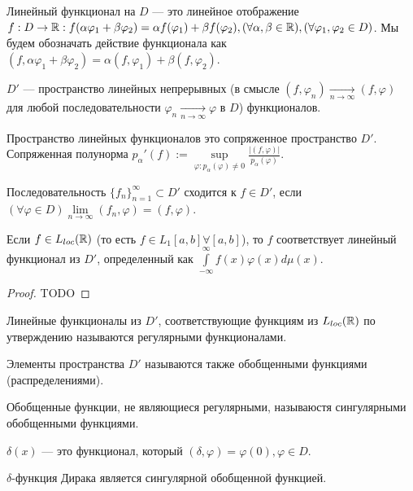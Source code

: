 \begin{Def}
	Линейный функционал на $D$ --- это линейное отображение $f:D\to\mathbb{R}:f(\alpha\varphi_1+\beta\varphi_2)=\alpha f(\varphi_1)+\beta f(\varphi_2), (\forall\alpha,\beta\in\mathbb{R}),(\forall\varphi_1,\varphi_2\in D)$. Мы будем обозначать действие функционала как $(f,\alpha\varphi_1+\beta\varphi_2)=\alpha(f,\varphi_1)+\beta(f,\varphi_2)$.
\end{Def}
\begin{Def}
	$D'$ --- пространство линейных непрерывных (в смысле $(f,\varphi_n)\underset{n\to\infty}{\to}(f,\varphi)$ для любой последовательности $\varphi_n\underset{n\to\infty}{\to} \varphi$ в $D$) функционалов.
\end{Def}
Пространство линейных функционалов это сопряженное пространство $D'$. Сопряженная полунорма $p_\alpha'(f):=\sup\limits_{\varphi:p_\alpha(\varphi)\ne0}\frac{|(f,\varphi)|}{p_\alpha(\varphi)}$.

\begin{Def}
	Последовательность $\{f_n\}_{n=1}^\infty\subset D'$ сходится к $f\in D'$, если $(\forall\varphi\in D) \lim\limits_{n\to\infty}(f_n,\varphi)=(f,\varphi)$.
\end{Def}

\begin{prop}
	Если $f\in L_{loc}(\mathbb{R})$ (то есть $f\in L_1[a,b] \forall[a,b]$), то $f$ соответствует линейный функционал из $D'$, определенный как $\int\limits_{-\infty}^\infty f(x)\varphi(x)d\mu(x)$.
\end{prop}
\begin{proof}
TODO
\end{proof}

\begin{Def}
	Линейные функционалы из $D'$, соответствующие функциям из $L_{loc}(\mathbb{R})$ по утверждению называются регулярными функционалами. 
	
	Элементы пространства $D'$ называются также обобщенными функциями (распределениями).
	
	Обобщенные функции, не являющиеся регулярными, называюстя сингулярными обобщенными функциями.
\end{Def}

\begin{example}
	$\delta(x)$ --- это функционал, который $(\delta, \varphi)=\varphi(0), \varphi\in D$.
\end{example}

\begin{prop}
	$\delta$-функция Дирака является сингулярной обобщенной функцией.
\end{prop}

